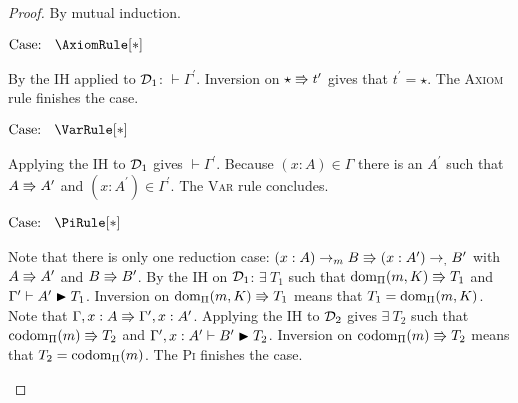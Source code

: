 \begin{proof}
    By mutual induction.

    $\text{Case: }\begin{array}{c} \AxiomRule[*] \end{array}$
    \begin{proofcase}
        By the IH applied to $\mathcal{D}_{1}$: $\vdash \Gamma^\prime$.
        Inversion on $\star \Rrightarrow t^\prime$ gives that $t^\prime = \star$.
        The \textsc{Axiom} rule finishes the case.
    \end{proofcase}

    $\text{Case: }\begin{array}{c} \VarRule[*] \end{array}$
    \begin{proofcase}
        Applying the IH to $\mathcal{D}_{1}$ gives $\vdash \Gamma^\prime$.
        Because $(x : A) \in \Gamma$ there is an $A^\prime$ such that $A \Rrightarrow A^\prime$ and $(x : A^\prime) \in \Gamma^\prime$.
        The \textsc{Var} rule concludes.
    \end{proofcase}

    $\text{Case: }\begin{array}{c} \PiRule[*] \end{array}$
    \begin{proofcase}
        Note that there is only one reduction case: $(x : A) \to_m B \Rrightarrow (x : A^\prime) \to_, B^\prime$ with $A \Rrightarrow A^\prime$ and $B \Rrightarrow B^\prime$.
        By the IH on $\mathcal{D}_{1}$: $\exists\ T_1$ such that $\mbox{\normalfont dom}_\Pi(m, K) \Rrightarrow T_1$ and $\Gamma^\prime \vdash A^\prime \blacktriangleright T_1$.
        Inversion on $\mbox{\normalfont dom}_\Pi(m, K) \Rrightarrow T_1$ means that $T_1 = \mbox{\normalfont dom}_\Pi(m, K)$.
        Note that $\Gamma, x : A \Rrightarrow \Gamma^\prime, x : A^\prime$.
        Applying the IH to $\mathcal{D}_{2}$ gives $\exists\ T_2$ such that $\mbox{\normalfont codom}_\Pi(m) \Rrightarrow T_2$ and $\Gamma^\prime, x : A^\prime \vdash B^\prime \blacktriangleright T_2$.
        Inversion on $\mbox{\normalfont codom}_\Pi(m) \Rrightarrow T_2$ means that $T_2 = \mbox{\normalfont codom}_\Pi(m)$.
        The \textsc{Pi} finishes the case.
    \end{proofcase}


\end{proof}

